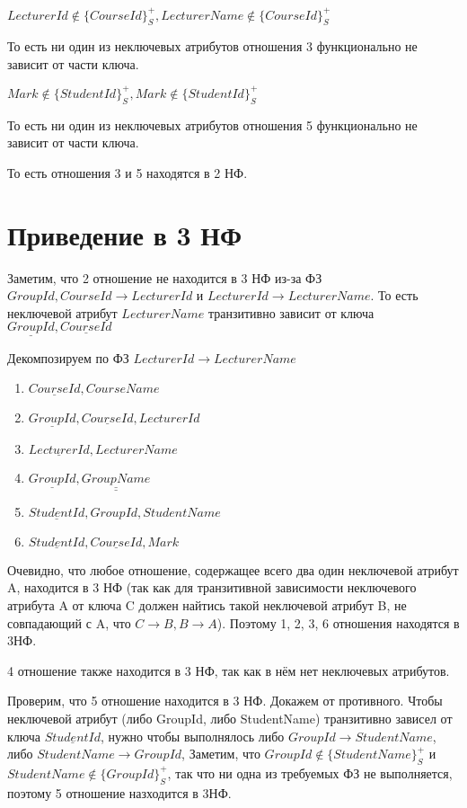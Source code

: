 \documentclass{article}
\begin{document}
	$LecturerId \not\in \{CourseId\}_S^+, LecturerName \not\in \{CourseId\}_S^+$
	
	То есть ни один из неключевых атрибутов отношения 3 функционально не зависит от части ключа.
	
	$Mark \not\in \{StudentId\}_S^+, Mark \not\in \{StudentId\}_S^+$
	
	То есть ни один из неключевых атрибутов отношения 5 функционально не зависит от части ключа.
	
	То есть отношения 3 и 5 находятся в 2 НФ.
	
	\section{Приведение в 3 НФ}
	
	Заметим, что 2 отношение не находится в 3 НФ из-за ФЗ $GroupId, CourseId \rightarrow LecturerId$ и $LecturerId \rightarrow LecturerName$. То есть неключевой атрибут $LecturerName$ транзитивно зависит от ключа $\underline{GroupId}, \underline{CourseId}$
	
	Декомпозируем по ФЗ $LecturerId \rightarrow LecturerName$
	
	\begin{enumerate}
		\item $\underline{CourseId}, CourseName$
		\item $\underline{GroupId}, \underline{CourseId}, LecturerId$
		\item $\underline{LecturerId}, LecturerName$
		\item $\underline{GroupId}, \underline{\underline{GroupName}}$
		\item $\underline{StudentId}, GroupId, StudentName$
		\item $\underline{StudentId}, \underline{CourseId}, Mark$
	\end{enumerate}

	Очевидно, что любое отношение, содержащее всего два один неключевой атрибут A, находится в 3 НФ (так как для транзитивной зависимости неключевого атрибута A от ключа C должен найтись такой неключевой атрибут B, не совпадающий с A, что $C \rightarrow B, B \rightarrow A$). Поэтому 1, 2, 3, 6 отношения находятся в 3НФ. 
	
	4 отношение также находится в 3 НФ, так как в нём нет неключевых атрибутов.
	
	Проверим, что 5 отношение находится в 3 НФ. Докажем от противного. Чтобы неключевой атрибут (либо GroupId, либо StudentName) транзитивно зависел от ключа $\underline{StudentId}$, нужно чтобы выполнялось либо $GroupId \rightarrow StudentName$, либо $StudentName \rightarrow GroupId$, Заметим, что  $GroupId \not\in \{StudentName\}_S^+$ и $StudentName \not\in \{GroupId\}_S^+$, так что ни одна из требуемых ФЗ не выполняется, поэтому 5 отношение назходится в 3НФ.
	
\end{document}
